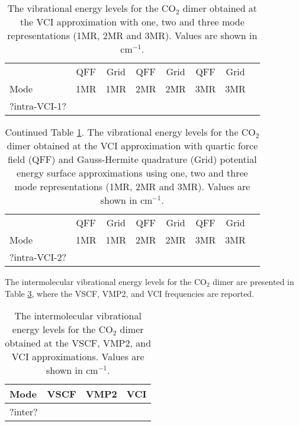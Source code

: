 \documentclass[aip,jcp,showpacs,superscriptaddress,groupedaddress]{revtex4-1}  %
\begin{document}
\begin{table}[H]
\caption{The vibrational energy levels for the CO$_2$ dimer obtained at the VCI approximation with one, two and three mode representations (1MR, 2MR and 3MR). Values are shown in cm$^{-1}$.}
\begin{ruledtabular}
\begin{tabular}{lccccccc}
    & QFF &  Grid & QFF & Grid & QFF & Grid   \\  
  Mode & 1MR & 1MR & 2MR & 2MR & 3MR & 3MR   \\ 
\hline \Tstrut
?intra-VCI-1?
\end{tabular}
\end{ruledtabular}
\label{table:intra-vci-1}
\end{table}


\begin{table}[b]
\caption{Continued Table \ref{table:intra-vci-1}. The vibrational energy levels for the CO$_2$ dimer obtained at the VCI approximation with quartic force field (QFF) and Gauss-Hermite quadrature (Grid) potential energy surface approximations using one, two and three mode representations (1MR, 2MR and 3MR). Values are shown in cm$^{-1}$.}
\begin{ruledtabular}
\begin{tabular}{lccccccc}
    & QFF &  Grid & QFF & Grid & QFF & Grid   \\  
  Mode & 1MR & 1MR & 2MR & 2MR & 3MR & 3MR   \\ 
\hline \Tstrut
?intra-VCI-2?
\end{tabular}
\end{ruledtabular}
\label{table:intra-vci-2}
\end{table}

The intermolecular vibrational energy levels for the CO$_2$ dimer are presented in Table \ref{table:inter}, where the VSCF, VMP2, and VCI frequencies are reported.

\begin{table}[H]
\caption{The intermolecular vibrational energy levels for the CO$_2$ dimer obtained at the VSCF, VMP2, and VCI approximations. Values are shown in cm$^{-1}$.}
\begin{ruledtabular}
\begin{tabular}{lccc}
  Mode & VSCF & VMP2 & VCI    \\ 
\hline \Tstrut
?inter?
\end{tabular}
\end{ruledtabular}
\label{table:inter}
\end{table}
\end{document}
